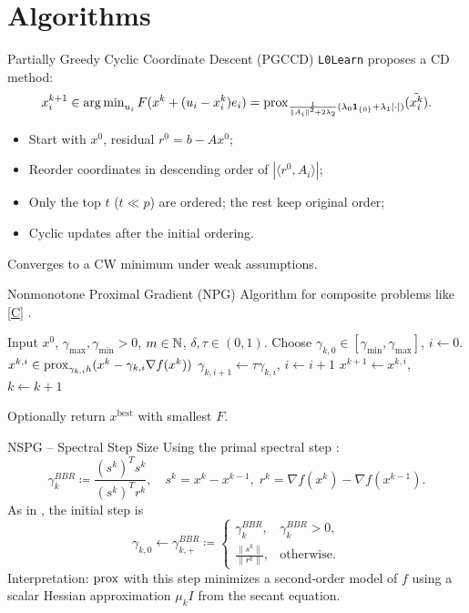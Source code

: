 \section{Algorithms}

\begin{frame}{Partially Greedy Cyclic Coordinate Descent (PGCCD)}
\texttt{L0Learn} \cite{fastselect} proposes a CD method:
\[
x^{k+1}_i \in \operatorname{arg\,min}_{u_i} F(x^k + (u_i-x_i^k)e_i)
= \operatorname{prox}_{\frac{1}{\|A_i\|^2+2\lambda_2} (\lambda_0\mathbf{1}_{\{0\}}+\lambda_1|\cdot|)}(\tilde{x_i^k}).
\]
\begin{itemize}
\item Start with $x^0$, residual $r^0 = b - Ax^0$;
\item Reorder coordinates in descending order of $|\langle r^0, A_i \rangle|$;
\item Only the top $t$ ($t \ll p$) are ordered; the rest keep original order;
\item Cyclic updates after the initial ordering.
\end{itemize}
Converges to a CW minimum under weak assumptions.
\end{frame}

\begin{frame}{Nonmonotone Proximal Gradient (NPG)}
Algorithm for composite problems like \eqref{C} \cite{kanzow2021}.
\begin{algorithmic}[1]
\State Input $x^0$, $\gamma_{\max},\gamma_{\min}>0$, $m\in\mathbb{N}$, $\delta,\tau\in(0,1)$.
\Repeat
\State Choose $\gamma_{k,0} \in [\gamma_{\min},\gamma_{\max}]$, $i\gets0$.
\State $x^{k,i} \in \operatorname{prox}_{\gamma_{k,i} h}(x^k - \gamma_{k,i}\nabla f(x^k))$
\State $\gamma_{k,i+1} \gets \tau \gamma_{k,i}$, $i \gets i+1$
\EndWhile
\State $x^{k+1} \gets x^{k,i}$, $k \gets k+1$
\end{algorithmic}
Optionally return $x^{\text{best}}$ with smallest $F$.
\end{frame}

\begin{frame}{NSPG – Spectral Step Size}
Using the primal spectral step \cite{BB1,BB2}:
\begin{equation} \label{BBR}
\gamma_k^{BBR} \coloneqq \frac{(s^k)^T s^k}{(s^k)^T r^k},\quad
s^k = x^k - x^{k-1},\; r^k = \nabla f(x^k) - \nabla f(x^{k-1}).
\end{equation}
As in \cite{positiveBB}, the initial step is
\[
\gamma_{k,0} \gets \gamma_{k,+}^{BBR} \coloneqq 
\begin{cases}
\gamma_k^{BBR}, & \gamma_k^{BBR} > 0,\\
\frac{\|s^k\|}{\|r^k\|}, & \text{otherwise}.
\end{cases}
\]
Interpretation: $\operatorname{prox}$ with this step minimizes a second‑order model of $f$ using a scalar Hessian approximation $\mu_k I$ from the secant equation.
\end{frame}

